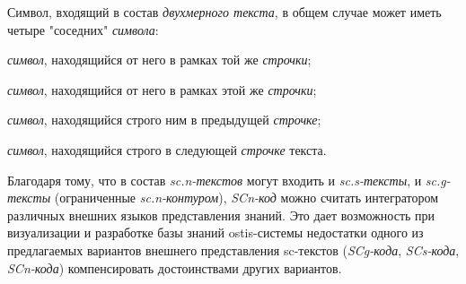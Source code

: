Символ, входящий в состав \textit{двухмерного текста}, в общем случае может иметь четыре "соседних"{} \textit{символа}: 
\begin{textitemize}
	\item \textit{символ}, находящийся от него  в рамках той же \textit{строчки};
	\item \textit{символ}, находящийся от него  в рамках этой же \textit{строчки};
	\item \textit{символ}, находящийся строго  ним в предыдущей \textit{строчке};
	\item \textit{символ}, находящийся строго  в следующей \textit{строчке} текста.
\end{textitemize}

Благодаря тому, что в состав \textit{sc.n-текстов} могут входить и \textit{sc.s-тексты}, и \textit{sc.g-тексты} (ограниченные \textit{sc.n-контуром}), \textit{SCn-код} можно считать интегратором различных внешних языков представления знаний.  Это дает возможность при визуализации и разработке базы знаний ostis-системы недостатки одного из предлагаемых вариантов внешнего представления sc-текстов (\textit{SCg-кода}, \textit{SCs-кода}, \textit{SCn-кода}) компенсировать достоинствами других вариантов.

\begin{SCn}
\end{SCn}

